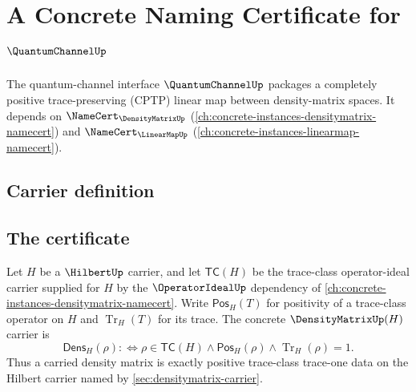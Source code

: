 \chapter{A Concrete Naming Certificate for $\QuantumChannelUp$}
\label{ch:concrete-instances-quantumchannel-namecert}

The quantum-channel interface $\QuantumChannelUp$ packages a completely positive trace-preserving (CPTP) linear map between density-matrix spaces. It depends on $\NameCert_{\DensityMatrixUp}$ (\autoref{ch:concrete-instances-densitymatrix-namecert}) and $\NameCert_{\LinearMapUp}$ (\autoref{ch:concrete-instances-linearmap-namecert}).

\section{Carrier definition}
\label{sec:quantumchannel-carrier}

\section{The certificate}
\label{sec:quantumchannel-certificate}

\begin{definition}
\label{def:densitymatrix-trace-class-carrier}
Let $H$ be a $\HilbertUp$ carrier, and let $\mathsf{TC}(H)$ be the trace-class operator-ideal carrier supplied for $H$ by the $\OperatorIdealUp$ dependency of \autoref{ch:concrete-instances-densitymatrix-namecert}. Write $\mathsf{Pos}_H(T)$ for positivity of a trace-class operator on $H$ and $\operatorname{Tr}_H(T)$ for its trace. The concrete $\DensityMatrixUp(H)$ carrier is
$$
\mathsf{Dens}_H(\rho)
:\Longleftrightarrow
\rho\in\mathsf{TC}(H)\land \mathsf{Pos}_H(\rho)\land \operatorname{Tr}_H(\rho)=1.
$$
Thus a carried density matrix is exactly positive trace-class trace-one data on the Hilbert carrier named by \autoref{sec:densitymatrix-carrier}.
\end{definition}

